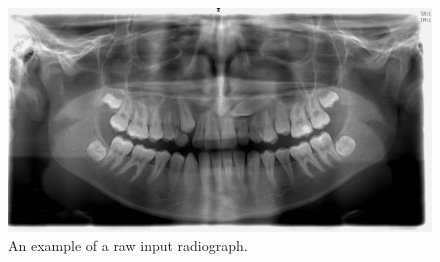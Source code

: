 \documentclass[a4paper,10pt]{article}
\begin{document}
\begin{figure}[h]
\centering
\includegraphics[width=160mm]{raw.png}
 \caption{An example of a raw input radiograph.}
\end{figure}
\end{document}
